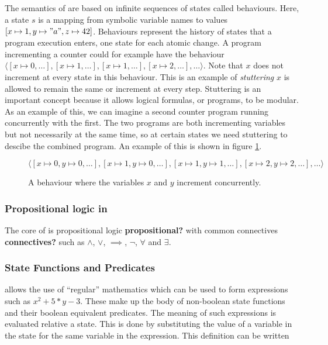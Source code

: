 \documentclass[english, biblatex, digitaloutput]{kththesis}
\begin{document}
\subsection{}

The semantics of  are based on infinite sequences of states called behaviours. Here, a state $s$ is a mapping from symbolic variable names to values \eg $[x \mapsto 1, y \mapsto "a", z \mapsto 42]$. Behaviours represent the history of states that a program execution enters, one state for each atomic change. A program incrementing a counter could for example have the behaviour $\langle [x \mapsto 0, \dotsc], [x \mapsto 1, \dotsc], [x \mapsto 1, \dotsc], [x \mapsto 2, \dotsc], \dotsc \rangle$. Note that $x$ does not increment at every state in this behaviour. This is an example of \textit{stuttering} \ie $x$ is allowed to remain the same or increment at every step. Stuttering is an important concept because it allows logical formulas, or programs, to be modular. As an example of this, we can imagine a second counter program running concurrently with the first. The two programs are both incrementing variables but not necessarily at the same time, so at certain states we need stuttering to descibe the combined program. An example of this is shown in figure \ref{fig:concurrent-behaviour}.

\begin{figure}
	$\langle [x \mapsto 0, y \mapsto 0, \dotsc], [x \mapsto 1, y \mapsto 0, \dotsc], [x \mapsto 1, y \mapsto 1, \dotsc], [x \mapsto 2, y \mapsto 2, \dotsc], \dotsc \rangle$
	\caption{A behaviour where the variables $x$ and $y$ increment concurrently.}
	\label{fig:concurrent-behaviour}
\end{figure}

\subsubsection{Propositional logic in }

The core of  is propositional logic \textbf{propositional?} with common connectives \textbf{connectives?} such as $\land$, $\lor$, $\implies$, $\lnot$, $\forall$ and $\exists$.

\subsubsection{State Functions and Predicates}

 allows the use of ``regular'' mathematics which can be used to form expressions such as $x^2 + 5*y - 3$. These make up the body of non-boolean state functions and their boolean equivalent predicates. The meaning of such expressions is evaluated relative a state. This is done by substituting the value of a variable in the state for the same variable in the expression. This definition can be written
\end{document}
